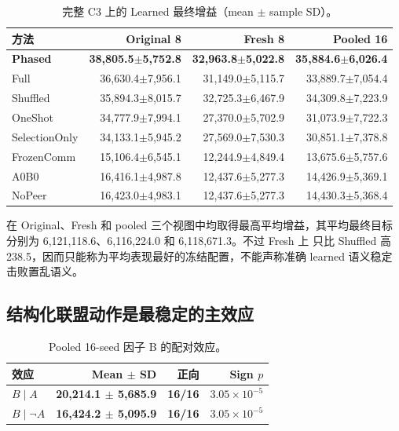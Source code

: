 \begin{table}[t]
\caption{完整 C3 上的 Learned 最终增益（mean $\pm$ sample SD）。}
\label{tab:learned-main}
\centering
\scriptsize
\setlength{\tabcolsep}{2.2pt}
\begin{tabular}{lrrr}
\toprule
方法 & Original 8 & Fresh 8 & Pooled 16 \\
\midrule
\textbf{Phased} & \textbf{38,805.5$\pm$5,752.8} &
\textbf{32,963.8$\pm$5,022.8} & \textbf{35,884.6$\pm$6,026.4} \\
Full & 36,630.4$\pm$7,956.1 & 31,149.0$\pm$5,115.7 & 33,889.7$\pm$7,054.4 \\
Shuffled & 35,894.3$\pm$8,015.7 & 32,725.3$\pm$6,467.9 & 34,309.8$\pm$7,223.9 \\
OneShot & 34,777.9$\pm$7,994.1 & 27,370.0$\pm$5,702.9 & 31,073.9$\pm$7,722.3 \\
SelectionOnly & 34,133.1$\pm$5,945.2 & 27,569.0$\pm$7,530.3 & 30,851.1$\pm$7,378.8 \\
FrozenComm & 15,106.4$\pm$6,545.1 & 12,244.9$\pm$4,849.4 & 13,675.6$\pm$5,757.6 \\
A0B0 & 16,416.1$\pm$4,987.8 & 12,437.6$\pm$5,277.3 & 14,426.9$\pm$5,369.1 \\
NoPeer & 16,423.0$\pm$4,983.1 & 12,437.6$\pm$5,277.3 & 14,430.3$\pm$5,368.4 \\
\bottomrule
\end{tabular}
\end{table}

\phased 在 Original、Fresh 和 pooled 三个视图中均取得最高平均增益，其平均最终目标分别为
6,121,118.6、6,116,224.0 和 6,118,671.3。不过 Fresh 上 \phased 只比 Shuffled 高
238.5，因而只能称为平均表现最好的冻结配置，不能声称准确 learned 语义稳定击败置乱语义。

\subsection{结构化联盟动作是最稳定的主效应}

\begin{table}[t]
\caption{Pooled 16-seed 因子 B 的配对效应。}
\label{tab:factor-b}
\centering
\small
\begin{tabular}{lrrr}
\toprule
效应 & Mean $\pm$ SD & 正向 & Sign $p$ \\
\midrule
$B\mid A$ & \textbf{20,214.1 $\pm$ 5,685.9} & \textbf{16/16} & $3.05\!\times\!10^{-5}$ \\
$B\mid\neg A$ & \textbf{16,424.2 $\pm$ 5,095.9} & \textbf{16/16} & $3.05\!\times\!10^{-5}$ \\
\bottomrule
\end{tabular}
\end{table}

